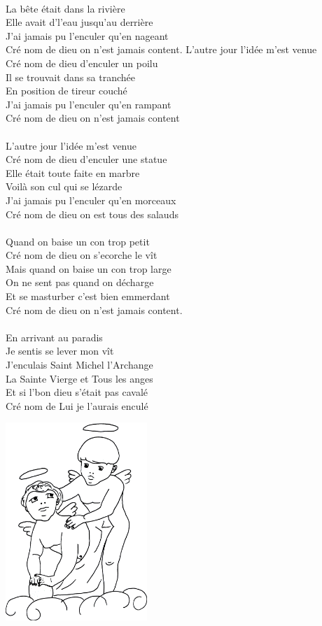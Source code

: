 \\La bête était dans la rivière
\\Elle avait d'l'eau jusqu'au derrière
\\J'ai jamais pu l'enculer qu'en nageant
\\Cré nom de dieu on n'est jamais content.
\breakpage
L'autre jour l'idée m'est venue
\\Cré nom de dieu d'enculer un poilu
\\Il se trouvait dans sa tranchée
\\En position de tireur couché
\\J'ai jamais pu l'enculer qu'en rampant
\\Cré nom de dieu on n'est jamais content
\\\\L'autre jour l'idée m'est venue
\\Cré nom de dieu d'enculer une statue
\\Elle était toute faite en marbre
\\Voilà son cul qui se lézarde
\\J'ai jamais pu l'enculer qu'en morceaux
\\Cré nom de dieu on est tous des salauds
\\\\Quand on baise un con trop petit
\\Cré nom de dieu on s'ecorche le vît
\\Mais quand on baise un con trop large
\\On ne sent pas quand on décharge
\\Et se masturber c'est bien emmerdant
\\Cré nom de dieu on n'est jamais content.
\\\\En arrivant au paradis
\\Je sentis se lever mon vît
\\J'enculais Saint Michel l'Archange
\\La Sainte Vierge et Tous les anges
\\Et si l'bon dieu s'était pas cavalé
\\Cré nom de Lui je l'aurais enculé
\begin{center}
\includegraphics[width=0.4\textwidth]{images/femme_vidangeur.jpg}
\end{center}

\breakpage